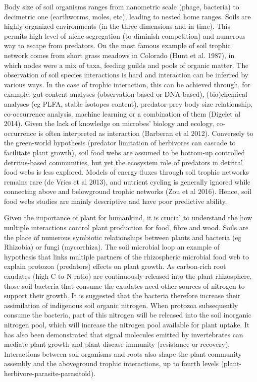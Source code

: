 Body size of soil organisms ranges from nanometric scale (phage, bacteria) to
decimetric one (earthworms, moles, etc), leading to nested home ranges. Soils
are highly organized environments (in the three dimensions and in time). This
permits high level of niche segregation (to diminish competition) and numerous
way to escape from predators. On the most famous example of soil trophic network
comes from short grass meadows in Colorado (Hunt et al. 1987), in which nodes
were a mix of taxa, feeding guilds and pools of organic matter. The observation
of soil species interactions is hard and interaction can be inferred by various
ways. In the case of trophic interaction, this can be achieved through, for
example, gut content analyses (observation-based or DNA-based), (bio)chemical
analyses (eg PLFA, stable isotopes content), predator-prey body size
relationship, co-occurrence analysis, machine learning or a combination of them
(Digelet al 2014). Given the lack of knowledge on microbes’ biology and ecology,
co-occurrence is often interpreted as interaction (Barberan et al 2012).
Conversely to the green-world hypothesis (predator limitation of herbivores can
cascade to facilitate plant growth), soil food webs are assumed to be bottom-up
controlled detritus-based communities, but yet the ecosystem role of predators
in detrital food webs is less explored. Models of energy fluxes through soil
trophic networks remains rare (de Vries et al 2013), and nutrient cycling is
generally ignored while connecting above and belowground trophic networks (Zou
et al 2016). Hence, soil food webs studies are mainly descriptive and have poor
predictive ability.

Given the importance of plant for humankind, it is crucial to understand the how
multiple interactions control plant production for food, fibre and wood. Soils
are the place of numerous symbiotic relationships between plants and bacteria
(eg Rhizobia) or fungi (mycorrhiza). The soil microbial loop an example of
hypothesis that links multiple partners of the rhizospheric microbial food web
to explain protozoa (predators) effects on plant growth. As carbon-rich root
exudates (high C to N ratio) are continuously released into the plant
rhizosphere, those soil bacteria that consume the exudates need other sources of
nitrogen to support their growth. It is suggested that the bacteria therefore
increase their assimilation of indigenous soil organic nitrogen. When protozoa
subsequently consume the bacteria, part of this nitrogen will be released into
the soil inorganic nitrogen pool, which will increase the nitrogen pool
available for plant uptake. It has also been demonstrated that signal molecules
emitted by invertebrates can mediate plant growth and plant disease immunity
(resistance or recovery). Interactions between soil organisms and roots also
shape the plant community assembly and the aboveground trophic interactions, up
to fourth levels (plant-herbivore-parasite-parasitoïd).

